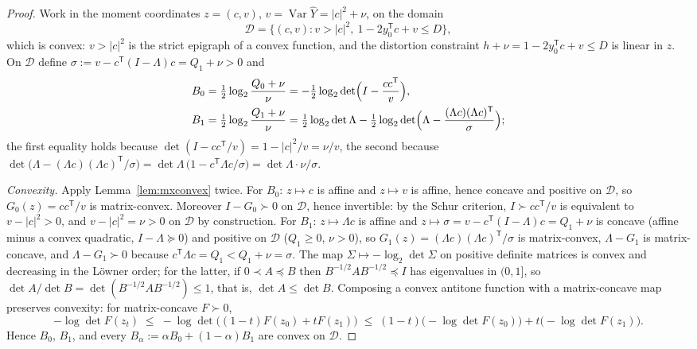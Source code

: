 ﻿\documentclass[11pt,onecolumn]{IEEEtran}
\newcommand{\hY}{\widehat{Y}}
\begin{document}
\begin{proof}
Work in the moment coordinates $z=(c,v)$,
$v=\operatorname{Var}\hY=|c|^2+\nu$, on the domain
\[
\mathcal D=\bigl\{(c,v):v>|c|^2,\ 1-2y_0^{\mathsf T}c+v\le D\bigr\},
\]
which is convex: $v>|c|^2$ is the strict epigraph of a convex
function, and the distortion constraint
$h+\nu=1-2y_0^{\mathsf T}c+v\le D$ is linear in $z$. On $\mathcal D$
define $\sigma:=v-c^{\mathsf T}(I-\Lambda)c=Q_1+\nu>0$ and
\begin{align*}
B_0&=\tfrac12\log_2\frac{Q_0+\nu}{\nu}
=-\tfrac12\log_2\det\Bigl(I-\frac{cc^{\mathsf T}}{v}\Bigr),\\
B_1&=\tfrac12\log_2\frac{Q_1+\nu}{\nu}
=\tfrac12\log_2\det\Lambda
-\tfrac12\log_2\det\Bigl(\Lambda
-\frac{(\Lambda c)(\Lambda c)^{\mathsf T}}{\sigma}\Bigr);
\end{align*}
the first equality holds because
$\det(I-cc^{\mathsf T}/v)=1-|c|^2/v=\nu/v$, the second because
$\det\bigl(\Lambda-(\Lambda c)(\Lambda c)^{\mathsf T}/\sigma\bigr)
=\det\Lambda\,\bigl(1-c^{\mathsf T}\Lambda c/\sigma\bigr)
=\det\Lambda\cdot \nu/\sigma$.

\emph{Convexity.} Apply Lemma~\ref{lem:mxconvex} twice. For $B_0$:
$z\mapsto c$ is affine and $z\mapsto v$ is affine, hence concave and
positive on $\mathcal D$, so $G_0(z)=cc^{\mathsf T}/v$ is
matrix-convex. Moreover $I-G_0\succ0$ on $\mathcal D$, hence
invertible: by the Schur criterion, $I\succ cc^{\mathsf T}/v$ is
equivalent to $v-|c|^2>0$, and $v-|c|^2=\nu>0$ on $\mathcal D$ by
construction. For $B_1$: $z\mapsto\Lambda c$ is affine and
$z\mapsto\sigma=v-c^{\mathsf T}(I-\Lambda)c=Q_1+\nu$ is concave (affine
minus a convex quadratic, $I-\Lambda\succeq0$) and positive on
$\mathcal D$ ($Q_1\ge0$, $\nu>0$), so
$G_1(z)=(\Lambda c)(\Lambda c)^{\mathsf T}/\sigma$ is matrix-convex,
$\Lambda-G_1$ is matrix-concave, and $\Lambda-G_1\succ0$ because
$c^{\mathsf T}\Lambda c=Q_1<Q_1+\nu=\sigma$. The map
$\Sigma\mapsto-\log_2\det\Sigma$ on positive definite matrices is
convex and decreasing in the L\"owner order; for the latter, if
$0\prec A\preceq B$ then $B^{-1/2}AB^{-1/2}\preceq I$ has eigenvalues
in $(0,1]$, so $\det A/\det B=\det(B^{-1/2}AB^{-1/2})\le1$, that is,
$\det A\le\det B$. Composing a convex
antitone function with a matrix-concave map preserves convexity: for
matrix-concave $F\succ0$,
\[
-\log\det F(z_t)
\;\le\;-\log\det\bigl((1-t)F(z_0)+tF(z_1)\bigr)
\;\le\;(1-t)\bigl(-\log\det F(z_0)\bigr)
+t\bigl(-\log\det F(z_1)\bigr).
\]
Hence $B_0$, $B_1$, and every
$B_\alpha:=\alpha B_0+(1-\alpha)B_1$ are convex on $\mathcal D$.


\end{proof}
\end{document}
